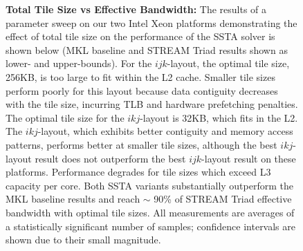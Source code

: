 \documentclass{sig-alternate-05-2015}
\begin{document}
\begin{figure}[!bth]
  \centering
  \caption{
    \textbf{Total Tile Size vs Effective Bandwidth:}
    The results of a parameter sweep on our two Intel Xeon platforms
      demonstrating the effect of total tile size on the performance of the
      SSTA solver is shown below (MKL baseline and STREAM Triad results shown as
      lower- and upper-bounds).
    For the \(ijk\)-layout, the optimal tile size, 256KB, is too large to fit
      within the L2 cache.
    Smaller tile sizes perform poorly for this layout because data contiguity
      decreases with the tile size, incurring TLB and hardware prefetching
      penalties.
    The optimal tile size for the \(ikj\)-layout is 32KB, which fits in the L2. 
    The \(ikj\)-layout, which exhibits better contiguity and memory access
      patterns, performs better at smaller tile sizes, although the best
      \(ikj\)-layout result does not outperform the best \(ijk\)-layout result
      on these platforms.
    Performance degrades for tile sizes which exceed L3 capacity per core.
    Both SSTA variants substantially outperform the MKL baseline results and 
      reach \(\sim\) 90\% of STREAM Triad effective bandwidth with optimal 
      tile sizes.
    All measurements are averages of a statistically significant number of
      samples; confidence intervals are shown due to their small magnitude.
  }
  \label{fig:results:tile_size_xeon}
  \vspace{1em}
  \begin{minipage}{0.49\textwidth}
\end{minipage}
\end{figure}
\end{document}
